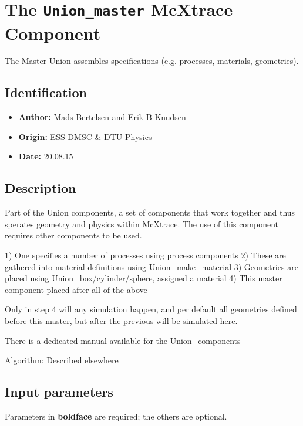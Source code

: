 \section{The \texttt{Union\_master} McXtrace Component}
The Master Union assembles specifications (e.g. processes, materials, geometries).

\subsection*{Identification}
\begin{itemize}
  \item \textbf{Author:} Mads Bertelsen and Erik B Knudsen
  \item \textbf{Origin:} ESS DMSC \& DTU Physics
  \item \textbf{Date:} 20.08.15
\end{itemize}

\subsection*{Description}
Part of the Union components, a set of components that work together and thus sperates geometry and physics within McXtrace. The use of this component requires other components to be used.

1) One specifies a number of processes using process components 2) These are gathered into material definitions using Union\_make\_material 3) Geometries are placed using Union\_box/cylinder/sphere, assigned a material 4) This master component placed after all of the above

Only in step 4 will any simulation happen, and per default all geometries defined before this master, but after the previous will be simulated here.

There is a dedicated manual available for the Union\_components

Algorithm: Described elsewhere

\subsection*{Input parameters}
Parameters in \textbf{boldface} are required; the others are optional.

